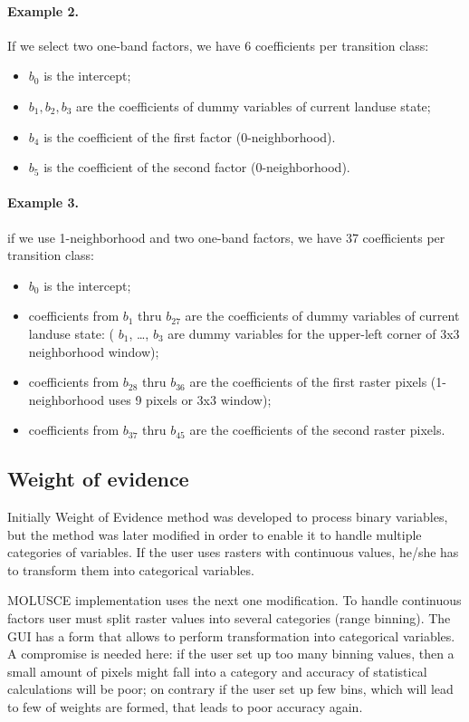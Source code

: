 \documentclass{report}
\begin{document}
\paragraph{Example 2.}
If we select two one-band factors, we have 6 coefficients per transition class:
\begin{itemize}
  \item $b_{0}$ is the intercept;
  \item $b_{1},b_{2},b_{3}$ are the coefficients of dummy variables of current landuse state;
  \item $b_{4}$ is the coefficient of the first factor (0-neighborhood).
  \item $b_{5}$ is the coefficient of the second factor (0-neighborhood).
\end{itemize}

\paragraph{Example 3.}
if we use 1-neighborhood and two one-band factors, we have 37 coefficients per transition class:
\begin{itemize}
  \item $b_{0}$ is the intercept;
  \item coefficients from $b_{1}$ thru $b_{27}$ are the coefficients of dummy variables of current landuse state: ( $b_{1}$, \dots, $b_{3}$ are dummy variables for the upper-left corner of 3x3 neighborhood window);
  \item coefficients from $b_{28}$ thru $b_{36}$ are the coefficients of the first raster pixels (1-neighborhood uses 9 pixels or 3x3 window);
  \item coefficients from $b_{37}$ thru $b_{45}$ are the coefficients of the second raster pixels.
\end{itemize}

\subsection{Weight of evidence}\label{subsec:WoE}

Initially Weight of Evidence method was developed to process binary variables, but the method was later modified in order to enable it to handle multiple categories of variables.
If the user uses rasters with continuous values, he/she has to transform them into categorical variables.

MOLUSCE implementation uses the next one modification. To handle continuous factors user must split raster values into several categories (range binning). The GUI has a form that allows to perform transformation into categorical variables. A compromise is needed here: if the user set up too many binning values, then a small amount of pixels might fall into a category and accuracy of statistical calculations will be poor; on contrary if the user set up few bins, which will lead to few of weights are formed, that leads to poor accuracy again.
\end{document}
